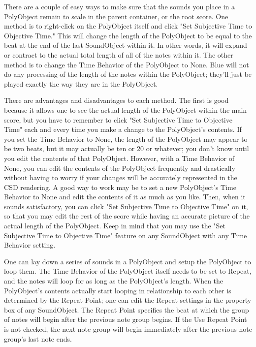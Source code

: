 There are a couple of easy ways to make sure that the sounds you place
in a PolyObject remain to scale in the parent container, or the root
score. One method is to right-click on the PolyObject itself and click
"Set Subjective Time to Objective Time." This will change the length of
the PolyObject to be equal to the beat at the end of the last
SoundObject within it. In other words, it will expand or contract to the
actual total length of all of the notes within it. The other method is
to change the Time Behavior of the PolyObject to None. Blue will not do
any processing of the length of the notes within the PolyObject; they'll
just be played exactly the way they are in the PolyObject.

There are advantages and disadvantages to each method. The first is good
because it allows one to see the actual length of the PolyObject within
the main score, but you have to remember to click "Set Subjective Time
to Objective Time" each and every time you make a change to the
PolyObject's contents. If you set the Time Behavior to None, the length
of the PolyObject may appear to be two beats, but it may actually be ten
or 20 or whatever; you don't know until you edit the contents of that
PolyObject. However, with a Time Behavior of None, you can edit the
contents of the PolyObject frequently and drastically without having to
worry if your changes will be accurately represented in the CSD
rendering. A good way to work may be to set a new PolyObject's Time
Behavior to None and edit the contents of it as much as you like. Then,
when it sounds satisfactory, you can click "Set Subjective Time to
Objective Time" on it, so that you may edit the rest of the score while
having an accurate picture of the actual length of the PolyObject. Keep
in mind that you may use the "Set Subjective Time to Objective Time"
feature on any SoundObject with any Time Behavior setting.

One can lay down a series of sounds in a PolyObject and setup the
PolyObject to loop them. The Time Behavior of the PolyObject itself
needs to be set to Repeat, and the notes will loop for as long as the
PolyObject's length. When the PolyObject's contents actually start
looping in relationship to each other is determined by the Repeat Point;
one can edit the Repeat settings in the property box of any SoundObject.
The Repeat Point specifies the beat at which the group of notes will
begin after the previous note group begins. If the Use Repeat Point is
not checked, the next note group will begin immediately after the
previous note group's last note ends.

